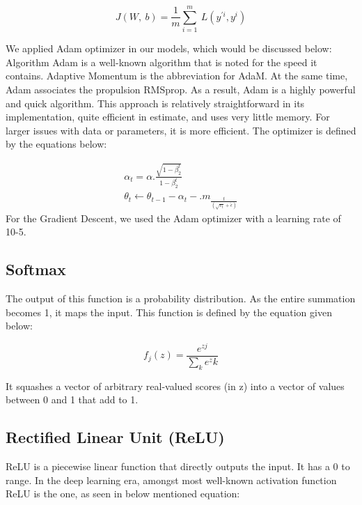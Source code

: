 \vspace{5mm}
\begin{equation*}
J(W,\ b) = \frac{1}{m}\sum_{i=1}^m\ L(y^{'i},y^i)
\end{equation*}

\vspace{5mm}
\noindent We applied Adam optimizer in our models, which would be discussed below: Algorithm Adam is a well-known algorithm that is noted for the speed it contains. Adaptive Momentum is the abbreviation for AdaM. At the same time, Adam associates the propulsion RMSprop. As a result, Adam is a highly powerful and quick algorithm. This approach is relatively straightforward in its implementation, quite efficient in estimate, and uses very little memory. For larger issues with data or parameters, it is more efficient. The optimizer is defined by the equations below:

\vspace{5mm}
\begin{equation*}
\begin{split}
\alpha_t = \alpha.\frac{\sqrt{1-\beta^t_2}}{1-\beta^t_2} \\
\theta_t\leftarrow\theta_{t-1}-\alpha_t-.m_{\frac{t}{(\sqrt{v_t}+\hat{\epsilon})}}
\end{split}
\end{equation*}
\vspace{5mm}
For the Gradient Descent, we used the Adam optimizer with a learning rate of 10-5. 

\vspace{5mm}
\subsection{Softmax}
\vspace{5mm}
\noindent The output of this function is a probability distribution. As the entire summation becomes 1, it maps the input. This function is defined by the equation given below:

\vspace{5mm}
\begin{equation*}
f_j(z)=\frac{e^{zj}}{\sum_k{e^zk}} 
\end{equation*}

\vspace{5mm}
\noindent It squashes a vector of arbitrary real-valued scores (in z) into a vector of values between 0 and 1 that add to 1.

\vspace{5mm}
\subsection{Rectified Linear Unit (ReLU)}
\vspace{5mm}
\noindent ReLU is a piecewise linear function that directly outputs the input. It has a 0 to range. In the deep learning era, amongst most well-known activation function ReLU is the one, as seen in below mentioned equation:

